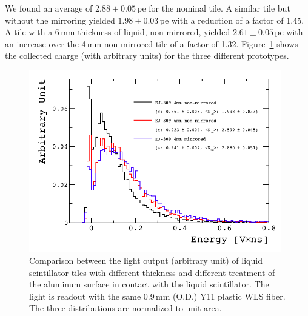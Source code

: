 \documentclass[review]{elsarticle}
\begin{document}
We found an average of 
$2.88\pm 0.05$\,pe for the nominal tile. A similar tile but without
the mirroring yielded $1.98\pm 0.03$\,pe with a reduction of a factor of
1.45. A tile with a 6\,mm thickness of liquid, non-mirrored, yielded
$2.61\pm 0.05$\,pe with an increase over the 4\,mm non-mirrored tile of a
factor of 1.32.
Figure~\ref{fig:thickness_comp} shows the collected charge (with arbitrary units)
for the three different prototypes.

\begin{figure}[!ht]
\begin{center}
\includegraphics[width=0.98\textwidth]{./figures/list_NEW_PROTOTYPES_all.png}
\caption{Comparison between the light output (arbitrary unit)
  of liquid scintillator
  tiles with different thickness and different treatment of the
  aluminum surface in contact with the liquid scintillator. The light
  is readout with the same 0.9\,mm (O.D.) Y11 plastic WLS fiber. The
  three distributions are normalized to unit area.}
\label{fig:thickness_comp}
\end{center}
\end{figure}
\end{document}
